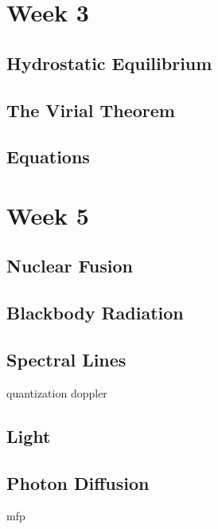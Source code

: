 \documentclass[a4paper,10pt]{article}
\begin{document}

\newpage
\section{Week 3}

\subsection{Hydrostatic Equilibrium}

\subsection{The Virial Theorem}

\subsection{Equations}



\newpage
\section{Week 5}

\subsection{Nuclear Fusion}

\subsection{Blackbody Radiation}

\subsection{Spectral Lines}
quantization
doppler

\subsection{Light}

\subsection{Photon Diffusion}
mfp
\end{document}

